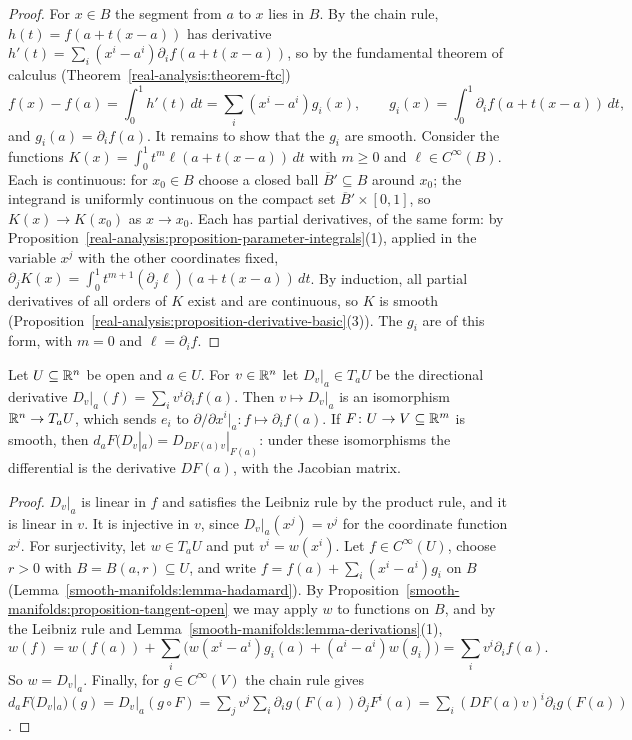 \begin{proof}
For $x \in B$ the segment from $a$ to $x$ lies in $B$. By the chain rule, $h(t) = f(a + t(x - a))$ has derivative
$h'(t) = \sum_i(x^i - a^i)\partial_if(a + t(x - a))$, so by the fundamental theorem of calculus (Theorem~\ref{real-analysis:theorem-ftc})
\[
f(x) - f(a) = \int_0^1h'(t)\,dt = \sum_i(x^i - a^i)g_i(x), \qquad g_i(x) = \int_0^1\partial_if(a + t(x - a))\,dt,
\]
and $g_i(a) = \partial_if(a)$. It remains to show that the $g_i$ are smooth. Consider the functions $K(x) = \int_0^1t^m\ell(a + t(x - a))\,dt$ with $m \geq 0$
and $\ell \in C^\infty(B)$. Each is continuous: for $x_0 \in B$ choose a closed ball $\overline{B}' \subseteq B$ around $x_0$; the integrand is uniformly
continuous on the compact set $\overline{B}' \times [0, 1]$, so $K(x) \to K(x_0)$ as $x \to x_0$. Each has partial derivatives, of the same form: by
Proposition~\ref{real-analysis:proposition-parameter-integrals}(1), applied in the variable $x^j$ with the other coordinates fixed,
$\partial_jK(x) = \int_0^1t^{m+1}(\partial_j\ell)(a + t(x - a))\,dt$. By induction, all partial derivatives of all orders of $K$ exist and are continuous, so $K$
is smooth (Proposition~\ref{real-analysis:proposition-derivative-basic}(3)). The $g_i$ are of this form, with $m = 0$ and $\ell = \partial_if$.
\end{proof}

\begin{proposition}\label{smooth-manifolds:proposition-tangent-euclidean}
Let $U \subseteq \mathbb{R}^n$ be open and $a \in U$. For $v \in \mathbb{R}^n$ let $D_v|_a \in T_aU$ be the directional derivative
$D_v|_a(f) = \sum_iv^i\partial_if(a)$. Then $v \mapsto D_v|_a$ is an isomorphism $\mathbb{R}^n \to T_aU$, which sends $e_i$ to
$\partial/\partial x^i|_a \colon f \mapsto \partial_if(a)$. If $F \colon U \to V \subseteq \mathbb{R}^m$ is smooth, then $d_aF(D_v|_a) = D_{DF(a)v}|_{F(a)}$: under these
isomorphisms the differential is the derivative $DF(a)$, with the Jacobian matrix.
\end{proposition}

\begin{proof}
$D_v|_a$ is linear in $f$ and satisfies the Leibniz rule by the product rule, and it is linear in $v$. It is injective in $v$, since $D_v|_a(x^j) = v^j$ for the
coordinate function $x^j$. For surjectivity, let $w \in T_aU$ and put $v^i = w(x^i)$. Let $f \in C^\infty(U)$, choose $r > 0$ with $B = B(a, r) \subseteq U$, and
write $f = f(a) + \sum_i(x^i - a^i)g_i$ on $B$ (Lemma~\ref{smooth-manifolds:lemma-hadamard}). By Proposition~\ref{smooth-manifolds:proposition-tangent-open} we
may apply $w$ to functions on $B$, and by the Leibniz rule and Lemma~\ref{smooth-manifolds:lemma-derivations}(1),
\[
w(f) = w(f(a)) + \sum_i\bigl(w(x^i - a^i)g_i(a) + (a^i - a^i)w(g_i)\bigr) = \sum_iv^i\partial_if(a).
\]
So $w = D_v|_a$. Finally, for $g \in C^\infty(V)$ the chain rule gives
$d_aF(D_v|_a)(g) = D_v|_a(g \circ F) = \sum_j v^j\sum_i\partial_ig(F(a))\partial_jF^i(a) = \sum_i(DF(a)v)^i\partial_ig(F(a))$.
\end{proof}

